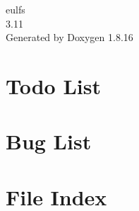 \let\mypdfximage\pdfximage\def\pdfximage{\immediate\mypdfximage}\documentclass[twoside]{book}
\newcommand{\+}{\discretionary{\mbox{\scriptsize$\hookleftarrow$}}{}{}}
\newcommand{\clearemptydoublepage}{%
  \newpage{\pagestyle{empty}\cleardoublepage}%
}
\begin{document}
\hypersetup{pageanchor=false,
             bookmarksnumbered=true,
             pdfencoding=unicode
            }
\begin{titlepage}
\vspace*{7cm}
\begin{center}%
{\Large eulfs \\[1ex]\large 3.\+11 }\\
\vspace*{1cm}
{\large Generated by Doxygen 1.8.16}\\
\end{center}
\end{titlepage}
\clearemptydoublepage
{}
\tableofcontents
\clearemptydoublepage
{}
\hypersetup{pageanchor=true}

\chapter{Todo List}
\label{todo}

\chapter{Bug List}
\label{bug}

\chapter{File Index}

\end{document}
